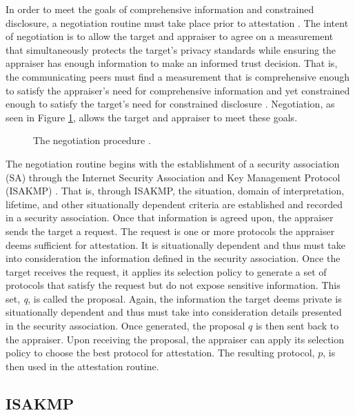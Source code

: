 \documentclass[12pt, letterpaper, twoside]{article}
\begin{document}
In order to meet the goals of comprehensive information and constrained disclosure, a negotiation routine must take place prior to attestation \cite{fritz}. The intent of negotiation is to allow the target and appraiser to agree on a measurement that simultaneously protects the target's privacy standards while ensuring the appraiser has enough information to make an informed trust decision. That is, the communicating peers must find a measurement that is comprehensive enough to satisfy the appraiser's need for comprehensive information and yet constrained enough to satisfy the target's need for constrained disclosure \cite{flexible}. Negotiation, as seen in Figure \ref{fig:sequence-fig}, allows the target and appraiser to meet these goals. 

\begin{figure}[hbtp]
  \centering 
  
  \caption[Negotiation process]{The negotiation procedure \cite{fritz}.}
  \label{fig:sequence-fig}
\end{figure}

The negotiation routine begins with the establishment of a security association (SA) through the Internet Security Association and Key Management Protocol (ISAKMP) \cite{ISAKMP}. That is, through ISAKMP, the situation, domain of interpretation, lifetime, and other situationally dependent criteria are established and recorded in a security association. Once that information is agreed upon, the appraiser sends the target a request. The request is one or more protocols the appraiser deems sufficient for attestation. It is situationally dependent and thus must take into consideration the information defined in the security association. Once the target receives the request, it applies its selection policy to generate a set of protocols that satisfy the request but do not expose sensitive information. This set, \emph{q}, is called the proposal. Again, the information the target deems private is situationally dependent and thus must take into consideration details presented in the security association. Once generated, the proposal $q$ is then sent back to the appraiser. Upon receiving the proposal, the appraiser can apply its selection policy to choose the best protocol for attestation. The resulting protocol, $p$, is then used in the attestation routine. 

\subsection{ISAKMP}
\end{document}
